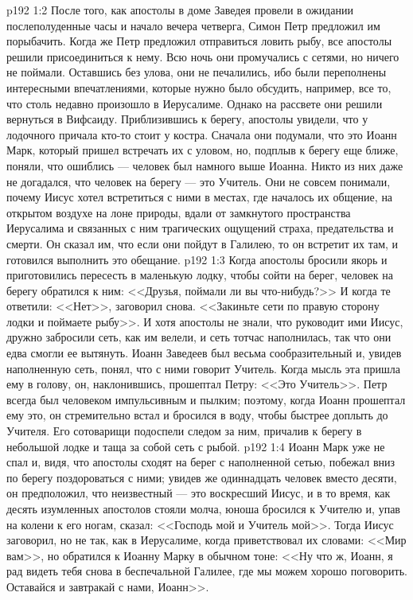 \vs p192 1:2 После того, как апостолы в доме Заведея провели в ожидании послеполуденные часы и начало вечера четверга, Симон Петр предложил им порыбачить. Когда же Петр предложил отправиться ловить рыбу, все апостолы решили присоединиться к нему. Всю ночь они промучались с сетями, но ничего не поймали. Оставшись без улова, они не печалились, ибо были переполнены интересными впечатлениями, которые нужно было обсудить, например, все то, что столь недавно произошло в Иерусалиме. Однако на рассвете они решили вернуться в Вифсаиду. Приблизившись к берегу, апостолы увидели, что у лодочного причала кто\hyp{}то стоит у костра. Сначала они подумали, что это Иоанн Марк, который пришел встречать их с уловом, но, подплыв к берегу еще ближе, поняли, что ошиблись --- человек был намного выше Иоанна. Никто из них даже не догадался, что человек на берегу --- это Учитель. Они не совсем понимали, почему Иисус хотел встретиться с ними в местах, где началось их общение, на открытом воздухе на лоне природы, вдали от замкнутого пространства Иерусалима и связанных с ним трагических ощущений страха, предательства и смерти. Он сказал им, что если они пойдут в Галилею, то он встретит их там, и готовился выполнить это обещание.
\vs p192 1:3 Когда апостолы бросили якорь и приготовились пересесть в маленькую лодку, чтобы сойти на берег, человек на берегу обратился к ним: <<Друзья, поймали ли вы что\hyp{}нибудь?>> И когда те ответили: <<Нет>>, заговорил снова. <<Закиньте сети по правую сторону лодки и поймаете рыбу>>. И хотя апостолы не знали, что руководит ими Иисус, дружно забросили сеть, как им велели, и сеть тотчас наполнилась, так что они едва смогли ее вытянуть. Иоанн Заведеев был весьма сообразительный и, увидев наполненную сеть, понял, что с ними говорит Учитель. Когда мысль эта пришла ему в голову, он, наклонившись, прошептал Петру: <<Это Учитель>>. Петр всегда был человеком импульсивным и пылким; поэтому, когда Иоанн прошептал ему это, он стремительно встал и бросился в воду, чтобы быстрее доплыть до Учителя. Его сотоварищи подоспели следом за ним, причалив к берегу в небольшой лодке и таща за собой сеть с рыбой.
\vs p192 1:4 Иоанн Марк уже не спал и, видя, что апостолы сходят на берег с наполненной сетью, побежал вниз по берегу поздороваться с ними; увидев же одиннадцать человек вместо десяти, он предположил, что неизвестный --- это воскресший Иисус, и в то время, как десять изумленных апостолов стояли молча, юноша бросился к Учителю и, упав на колени к его ногам, сказал: <<Господь мой и Учитель мой>>. Тогда Иисус заговорил, но не так, как в Иерусалиме, когда приветствовал их словами: <<Мир вам>>, но обратился к Иоанну Марку в обычном тоне: <<Ну что ж, Иоанн, я рад видеть тебя снова в беспечальной Галилее, где мы можем хорошо поговорить. Оставайся и завтракай с нами, Иоанн>>.
